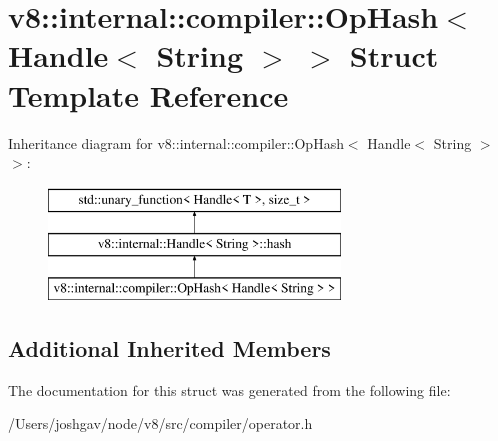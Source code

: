 \hypertarget{structv8_1_1internal_1_1compiler_1_1_op_hash_3_01_handle_3_01_string_01_4_01_4}{}\section{v8\+:\+:internal\+:\+:compiler\+:\+:Op\+Hash$<$ Handle$<$ String $>$ $>$ Struct Template Reference}
\label{structv8_1_1internal_1_1compiler_1_1_op_hash_3_01_handle_3_01_string_01_4_01_4}
Inheritance diagram for v8\+:\+:internal\+:\+:compiler\+:\+:Op\+Hash$<$ Handle$<$ String $>$ $>$\+:\begin{figure}[H]
\begin{center}
\leavevmode
\includegraphics[height=3.000000cm]{structv8_1_1internal_1_1compiler_1_1_op_hash_3_01_handle_3_01_string_01_4_01_4}
\end{center}
\end{figure}
\subsection*{Additional Inherited Members}


The documentation for this struct was generated from the following file\+:\begin{DoxyCompactItemize}
\item 
/\+Users/joshgav/node/v8/src/compiler/operator.\+h\end{DoxyCompactItemize}
